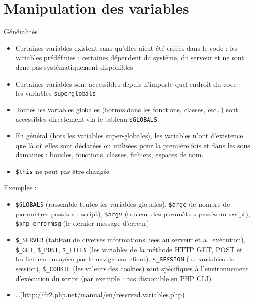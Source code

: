 
\section{Manipulation des variables}

\begin{frame}[containsverbatim]{Généralités}
	\begin{itemize}
		\item Certaines variables existent sans qu’elles aient été créées dans le code : les variables prédéfinies ; certaines dépendent du système, du serveur et ne sont donc pas systématiquement disponibles
		\item Certaines variables sont accessibles depuis n’importe quel endroit du code : les variables \texttt{superglobals}
		\item Toutes les variables globales (hormis dans les fonctions, classes, etc\ldots) sont accessibles directement via le tableau \texttt{\$GLOBALS}
		\item En général (hors les variables super-globales), les variables n’ont d’existence que là où elles sont déclarées ou utilisées pour la première fois et dans les sous domaines : boucles, fonctions, classes, fichiers, espaces de nom.
		\item \texttt{\$this} ne peut pas être changée
	\end{itemize}
	Exemples :
	\begin{itemize}
		\item \texttt{\$GLOBALS} (rassemble toutes les variables globales), \texttt{\$argc} (le nombre de paramètres passés au script), \texttt{\$argv} (tableau des paramètres passés au script), \texttt{\$php\_errormsg} (le dernier message d’erreur)
		\item \texttt{\$\_SERVER} (tableau de diverses informations liées au serveur et à l’exécution), \texttt{\$\_GET}, \texttt{\$\_POST}, \texttt{\$\_FILES} (les variables de la méthode HTTP GET, POST et les fichiers envoyées par le navigateur client), \texttt{\$\_SESSION} (les variables de session), \texttt{\$\_COOKIE} (les valeurs des cookies) sont spécifiques à l’environnement d’exécution du script (par exemple : pas disponible en PHP CLI)
		\item \ldots (\url{http://fr2.php.net/manual/en/reserved.variables.php})
	\end{itemize}
\end{frame}
 
